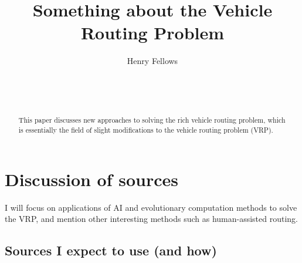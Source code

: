 \documentclass{sig-alternate}
\begin{document}

\title{Something about the Vehicle Routing Problem}


\author{
\alignauthor
Henry Fellows\\
	\\
	\\
	\\
}

\maketitle

\begin{abstract}
This paper discusses new approaches to solving the rich vehicle routing problem, which is essentially the field of slight modifications to the vehicle routing problem (VRP).
\end{abstract}

\section{Discussion of sources}

I will focus on applications of AI and evolutionary computation methods to solve the VRP, and mention other interesting methods such as human-assisted routing.

\subsection{Sources I expect to use (and how)}
\end{document}

